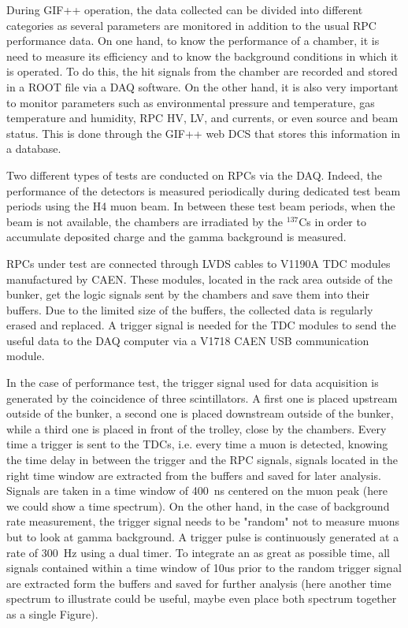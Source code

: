 	During GIF++ operation, the data collected can be divided into different categories as several parameters are monitored in addition to the usual RPC performance data. On one hand, to know the performance of a chamber, it is need to measure its efficiency and to know the background conditions in which it is operated. To do this, the hit signals from the chamber are recorded and stored in a ROOT file via a DAQ software. On the other hand, it is also very important to monitor parameters such as environmental pressure and temperature, gas temperature and humidity, RPC HV, LV, and currents, or even source and beam status. This is done through the GIF++ web DCS that stores this information in a database.
	            
	Two different types of tests are conducted on RPCs via the DAQ. Indeed, the performance of the detectors is measured periodically during dedicated test beam periods using the H4 muon beam. In between these test beam periods, when the beam is not available, the chambers are irradiated by the $^{137}$Cs in order to accumulate deposited charge and the gamma background is measured.
	
	RPCs under test are connected through LVDS cables to V1190A TDC modules manufactured by CAEN. These modules, located in the rack area outside of the bunker, get the logic signals sent by the chambers and save them into their buffers. Due to the limited size of the buffers, the collected data is regularly erased and replaced. A trigger signal is needed for the TDC modules to send the useful data to the DAQ computer via a V1718 CAEN USB communication module.
	
	In the case of performance test, the trigger signal used for data acquisition is generated by the coincidence of three scintillators. A first one is placed upstream outside of the bunker, a second one is placed downstream outside of the bunker, while a third one is placed in front of the trolley, close by the chambers. Every time a trigger is sent to the TDCs, i.e. every time a muon is detected, knowing the time delay in between the trigger and the RPC signals, signals located in the right time window are extracted from the buffers and saved for later analysis. Signals are taken in a time window of \SI{400}{ns} centered on the muon peak (here we could show a time spectrum). On the other hand, in the case of background rate measurement, the trigger signal needs to be "random" not to measure muons but to look at gamma background. A trigger pulse is continuously generated at a rate of \SI{300}{Hz} using a dual timer. To integrate an as great as possible time, all signals contained within a time window of 10us prior to the random trigger signal are extracted form the buffers and saved for further analysis (here another time spectrum to illustrate could be useful, maybe even place both spectrum together as a single Figure).
	
